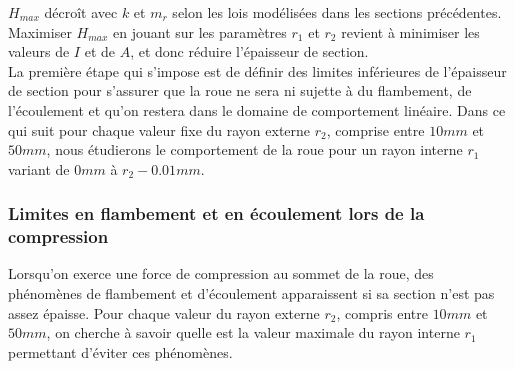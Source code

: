 $H_{max}$ décroît avec $k$ et $m_r$ selon les lois modélisées dans les sections précédentes. Maximiser $H_{max}$ en jouant sur les paramètres $r_1$ et $r_2$ revient à minimiser les valeurs de $I$ et de $A$, et donc réduire l'épaisseur de section. \\
La première étape qui s'impose est de définir des limites inférieures de l'épaisseur de section pour s'assurer que la roue ne sera ni sujette à du flambement, de l'écoulement et qu'on restera dans le domaine de comportement linéaire.
Dans ce qui suit pour chaque valeur fixe du rayon externe $r_2$, comprise entre $10 mm$ et $50 mm$, nous étudierons le comportement de la roue pour un rayon interne $r_1$ variant de $0 mm$ à $r_2 - 0.01 mm$.

\subsubsection{Limites en flambement et en écoulement lors de la compression}

Lorsqu'on exerce une force de compression au sommet de la roue, des phénomènes de flambement et d'écoulement apparaissent si sa section n'est pas assez épaisse. 
Pour chaque valeur du rayon externe $r_2$, compris entre $10 mm$ et $50 mm$, on cherche à savoir quelle est la valeur maximale du rayon interne $r_1$ permettant d'éviter ces phénomènes. 

